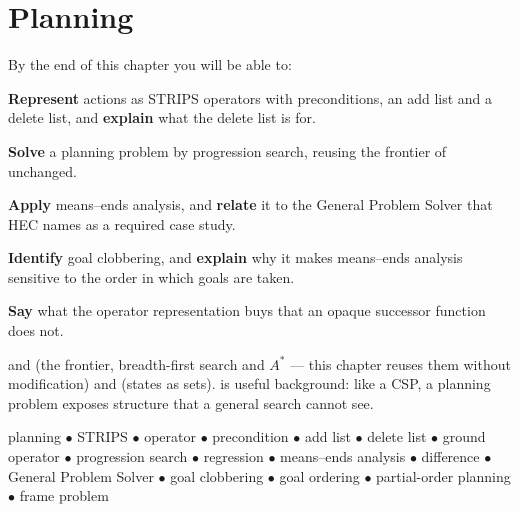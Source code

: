 \chapter{Planning}\label{ch:planning}

\begin{outcomes}
By the end of this chapter you will be able to:
\begin{tight}
  \item \textbf{Represent} actions as STRIPS operators with preconditions, an add
        list and a delete list, and \textbf{explain} what the delete list is for.
  \item \textbf{Solve} a planning problem by progression search, reusing the
        frontier of  unchanged.
  \item \textbf{Apply} means--ends analysis, and \textbf{relate} it to the General
        Problem Solver that HEC names as a required case study.
  \item \textbf{Identify} goal clobbering, and \textbf{explain} why it makes
        means--ends analysis sensitive to the order in which goals are taken.
  \item \textbf{Say} what the operator representation buys that an opaque
        successor function does not.
\end{tight}
\end{outcomes}

\begin{prereq}
 and  (the frontier, breadth-first search and
$A^{*}$ --- this chapter reuses them without modification) and 
(states as sets).  is useful background: like a CSP, a planning problem
exposes structure that a general search cannot see.
\end{prereq}

\begin{keyterms}
planning $\bullet$ STRIPS $\bullet$ operator $\bullet$ precondition $\bullet$ add
list $\bullet$ delete list $\bullet$ ground operator $\bullet$ progression search
$\bullet$ regression $\bullet$ means--ends analysis $\bullet$ difference $\bullet$
General Problem Solver $\bullet$ goal clobbering $\bullet$ goal ordering $\bullet$
partial-order planning $\bullet$ frame problem
\end{keyterms}

